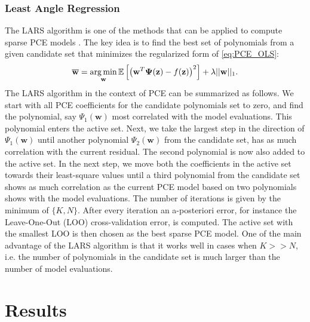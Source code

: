 \subsubsection{Least Angle Regression}
The LARS algorithm \cite{efron2004} is one of the methods that can be applied to compute sparse PCE models \cite{BlatmanThesis}. The key idea is to find the best set of polynomials from a given candidate set that minimizes the regularized form of \eqref{eq:PCE_OLS}:
\begin{equation}\label{regularized_LS}
\mathbf{\overline{w}} = \operatorname*{arg\,min}_{\mathbf{w}} \mathbb{E}\left[\left(\mathbf{w}^T \boldsymbol{\Psi}(\mathbf{z}) - f(\mathbf{z})\right)^2\right] + \lambda ||\mathbf{w}||_1.
\end{equation}
The LARS algorithm in the context of PCE can be summarized as follows. We start with all PCE coefficients for the candidate polynomials set to zero, and find the polynomial, say $\Psi_1(\mathbf{w})$ most correlated with the model evaluations. This polynomial enters the active set. Next, we take the largest step in the direction of $\Psi_1(\mathbf{w})$ until another polynomial $\Psi_2(\mathbf{w})$ from the candidate set, has as much correlation with the current residual. The second polynomial is now also added to the active set. In the next step, we move both the coefficients in the active set towards their least-square values until a third polynomial from the candidate set shows as much correlation as the current PCE model based on two polynomials shows with the model evaluations. The number of iterations is given by the minimum of $\{K,N\}$. After every iteration an a-posteriori error, for instance the Leave-One-Out (LOO) cross-validation error, is computed. The active set with the smallest LOO is then chosen as the best sparse PCE model. One of the main advantage of the LARS algorithm is that it works well in cases when $K>>N$, i.e. the number of polynomials in the candidate set is much larger than the number of model evaluations.



\section{Results}\label{sec:results}

